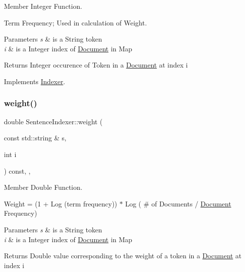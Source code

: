Member Integer Function. 

Term Frequency; Used in calculation of Weight.


\begin{DoxyParams}{Parameters}
{\em s} & is a String token \\
\hline
{\em i} & is a Integer index of \hyperlink{class_document}{Document} in Map \\
\hline
\end{DoxyParams}
\begin{DoxyReturn}{Returns}
Integer occurence of Token in a \hyperlink{class_document}{Document} at index i 
\end{DoxyReturn}


Implements \hyperlink{class_indexer_a96e17172c76abb679e7cd2ff4606ce4a}{Indexer}.

\mbox{\label{class_sentence_indexer_ad436ab76195615090de457b50aabfe7b}} 
\subsubsection{\texorpdfstring{weight()}{weight()}}
{\footnotesize\ttfamily double Sentence\+Indexer\+::weight (\begin{DoxyParamCaption}\item[{const std\+::string \&}]{s,  }\item[{int}]{i }\end{DoxyParamCaption}) const\hspace{0.3cm}{\ttfamily [override]}, {\ttfamily [private]}, {\ttfamily [virtual]}}



Member Double Function. 

Weight = (1 + Log (term frequency)) $\ast$ Log ( \# of Documents / \hyperlink{class_document}{Document} Frequency)


\begin{DoxyParams}{Parameters}
{\em s} & is a String token \\
\hline
{\em i} & is a Integer index of \hyperlink{class_document}{Document} in Map \\
\hline
\end{DoxyParams}
\begin{DoxyReturn}{Returns}
Double value corresponding to the weight of a token in a \hyperlink{class_document}{Document} at index i 
\end{DoxyReturn}


